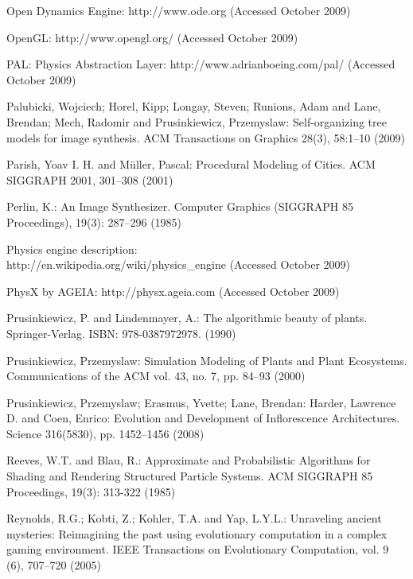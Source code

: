 \documentclass[twocolumn]{svjour3}
\begin{document}
\begin{thebibliography}{0}
Open Dynamics Engine:
http://www.ode.org
(Accessed October 2009)

OpenGL:
http://www.opengl.org/
(Accessed October 2009)

\begin{flushleft}
PAL: Physics Abstraction Layer:
http://www.adrianboeing.com/pal/
(Accessed October 2009)
\end{flushleft}

Palubicki, Wojciech; Horel, Kipp; Longay, Steven; Runions, Adam and Lane, Brendan;
Mech, Radomir and Prusinkiewicz, Przemyslaw:
Self-organizing tree models for image synthesis.
ACM Transactions on Graphics 28(3), 58:1--10 (2009)

Parish, Yoav I. H. and Müller, Pascal:
Procedural Modeling of Cities.
ACM SIGGRAPH 2001, 301--308 (2001)

Perlin, K.:
An Image Synthesizer.
Computer Graphics (SIGGRAPH 85 Proceedings), 19(3): 287--296 (1985)

Physics engine description: \\
http://en.wikipedia.org/wiki/physics\_engine
(Accessed October 2009)

PhysX by AGEIA:
http://physx.ageia.com
(Accessed October 2009)

Prusinkiewicz, P. and Lindenmayer, A.:
The algorithmic beauty of plants.
Springer-Verlag. ISBN: 978-0387972978. (1990)

Prusinkiewicz, Przemyslaw:
Simulation Modeling of Plants and Plant Ecosystems.
Communications of the ACM vol. 43, no. 7, pp. 84--93 (2000)

Prusinkiewicz, Przemyslaw; Erasmus, Yvette; Lane, Brendan: Harder, Lawrence D. and Coen, Enrico:
Evolution and Development of Inflorescence Architectures.
Science 316(5830), pp. 1452--1456 (2008)

Reeves, W.T. and Blau, R.:
Approximate and Probabilistic Algorithms for Shading and Rendering Structured Particle Systems.
ACM SIGGRAPH 85 Proceedings, 19(3): 313-322 (1985)

Reynolds, R.G.; Kobti, Z.; Kohler, T.A. and Yap, L.Y.L.:
Unraveling ancient mysteries: Reimagining the past using evolutionary computation in a complex gaming environment.
IEEE Transactions on Evolutionary Computation, vol. 9 (6), 707--720 (2005)


\end{thebibliography}
\end{document}
